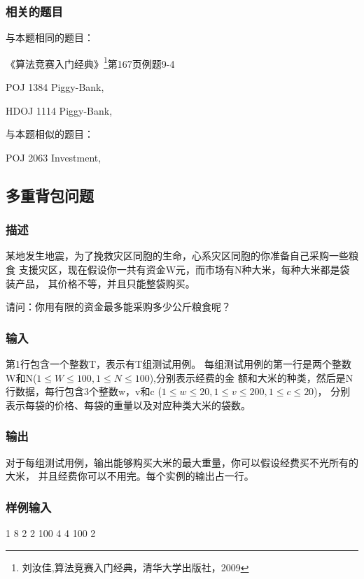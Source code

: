 \subsubsection{相关的题目}
与本题相同的题目：
\begindot
\item 《算法竞赛入门经典》\footnote{刘汝佳,算法竞赛入门经典，清华大学出版社，2009}第167页例题9-4
\item POJ 1384 Piggy-Bank, 
\item HDOJ 1114 Piggy-Bank, 
\myenddot

与本题相似的题目：
\begindot
\item POJ 2063 Investment, 
\myenddot

\subsection{多重背包问题}

\subsubsection{描述}
某地发生地震，为了挽救灾区同胞的生命，心系灾区同胞的你准备自己采购一些粮食
支援灾区，现在假设你一共有资金W元，而市场有N种大米，每种大米都是袋装产品，
其价格不等，并且只能整袋购买。

请问：你用有限的资金最多能采购多少公斤粮食呢？

\subsubsection{输入}
第1行包含一个整数T，表示有T组测试用例。
每组测试用例的第一行是两个整数W和N($1 \leq W \leq 100, 1 \leq N \leq 100$),分别表示经费的金
额和大米的种类，然后是N行数据，每行包含3个整数w，v和c
($1 \leq w \leq 20,1 \leq v \leq 200,1 \leq c \leq 20$)，
分别表示每袋的价格、每袋的重量以及对应种类大米的袋数。

\subsubsection{输出}
对于每组测试用例，输出能够购买大米的最大重量，你可以假设经费买不光所有的大米，
并且经费你可以不用完。每个实例的输出占一行。

\subsubsection{样例输入}
\begin{Code}
1
8 2
2 100 4
4 100 2
\end{Code}

